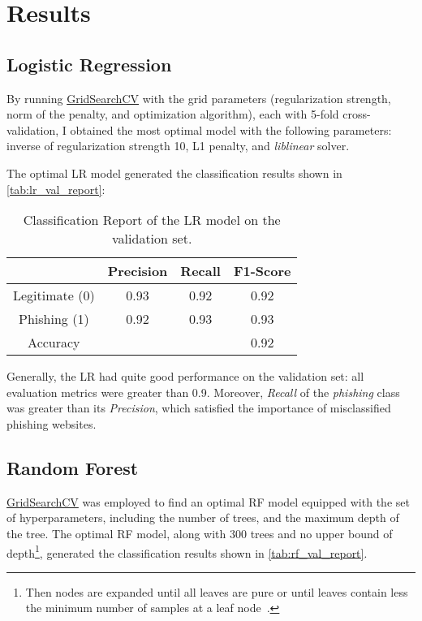 \section{Results}\label{sec:result}
\subsection{Logistic Regression}
By running \href{https://scikit-learn.org/stable/modules/generated/sklearn.model_selection.GridSearchCV.html}{GridSearchCV} 
with the grid parameters (regularization strength, norm of the penalty, and optimization algorithm),
each with 5-fold cross-validation, I obtained the most optimal model with the following parameters:
inverse of regularization strength 10, L1 penalty, and \emph{liblinear} solver.

The optimal LR model generated the classification results shown in \autoref{tab:lr_val_report}:
\begin{table}[ht!]
    \centering
    \begin{tabular}{|c|c|c|c|}
        \hline
         & Precision & Recall & F1-Score \\
        \hline
        Legitimate (0) & 0.93 & 0.92 & 0.92 \\
        Phishing (1) & 0.92 & 0.93 & 0.93 \\
        \hline
        Accuracy & & & 0.92  \\
        \hline
    \end{tabular}
    \caption{Classification Report of the LR model on the validation set.}
    \label{tab:lr_val_report}
\end{table}

Generally, the LR had quite good performance on the validation set: all evaluation metrics
were greater than 0.9. Moreover, \emph{Recall} of the \emph{phishing} class was greater
than its \emph{Precision}, which satisfied the importance of misclassified phishing websites.

\subsection{Random Forest}
\href{https://scikit-learn.org/stable/modules/generated/sklearn.model_selection.GridSearchCV.html}{GridSearchCV}
was employed to find an optimal RF model equipped with the set of hyperparameters, including
the number of trees, and the maximum depth of the tree. The optimal RF model,
along with 300 trees and no upper bound of depth\footnote{Then nodes are expanded until all
leaves are pure or until leaves contain less the minimum number of samples at a leaf node~\cite{RF-scikit-learn}.},
generated the classification results shown in \autoref{tab:rf_val_report}.

